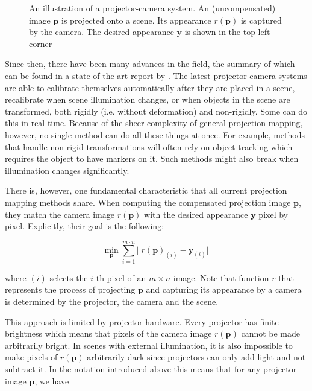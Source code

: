 \begin{figure}
    \centering
    \def\svgwidth{0.8\textwidth}
    
    \caption{An illustration of a projector-camera system. An (uncompensated) image \(\bm{p}\) is projected onto a scene. Its appearance \(r(\bm{p})\) is captured by the camera. The desired appearance \(\bm{y}\) is shown in the top-left corner}
    \label{fig:intro_procam}
\end{figure}

Since then, there have been many advances in the field, the summary of which can be found in a state-of-the-art report by \citet{Grundhofer2018}. The latest projector-camera systems are able to calibrate themselves automatically after they are placed in a scene, recalibrate when scene illumination changes, or when objects in the scene are transformed, both rigidly (i.e. without deformation) and non-rigidly. Some can do this in real time. Because of the sheer complexity of general projection mapping, however, no single method can do all these things at once. For example, methods that handle non-rigid transformations will often rely on object tracking which requires the object to have markers on it. Such methods might also break when illumination changes significantly.

There is, however, one fundamental characteristic that all current projection mapping methods share. When computing the compensated projection image \(\bm{p}\), they match the camera image \(r(\bm{p})\) with the desired appearance \(\bm{y}\) pixel by pixel. Explicitly, their goal is the following:

\begin{equation}
    \label{eq:projection_mapping-per_pixel}
    \min_{\bm{p}} \sum_{i=1}^{m \cdot n} || r(\bm{p})_{(i)} - \bm{y}_{(i)} ||
\end{equation}

where \((i)\) selects the \(i\)-th pixel of an \(m \times n\) image. Note that function \(r\) that represents the process of projecting \(\bm{p}\) and capturing its appearance by a camera is determined by the projector, the camera and the scene.

This approach is limited by projector hardware. Every projector has finite brightness which means that pixels of the camera image \(r(\bm{p})\) cannot be made arbitrarily bright. In scenes with external illumination, it is also impossible to make pixels of \(r(\bm{p})\) arbitrarily dark since projectors can only add light and not subtract it. In the notation introduced above this means that for any projector image \(\bm{p}\), we have

